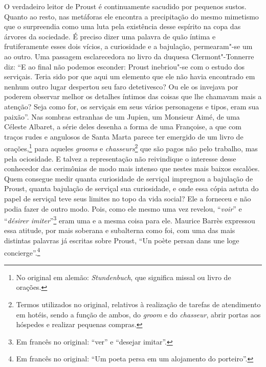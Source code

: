 O verdadeiro leitor de Proust é continuamente sacudido por pequenos
sustos. Quanto ao resto, nas metáforas ele encontra a precipitação do
mesmo mimetismo que o surpreendia como uma luta pela existência desse
espírito na copa das árvores da sociedade. É preciso dizer uma palavra
de quão íntima e frutiferamente esses dois vícios, a curiosidade e a
bajulação, permearam"-se um ao outro. Uma passagem esclarecedora no livro
da duquesa Clermont"-Tonnerre diz: ``E ao final não podemos esconder:
Proust inebriou"-se com o estudo dos serviçais. Teria sido por que aqui um
elemento que ele não havia encontrado em nenhum outro lugar despertou
seu faro detetivesco? Ou ele os invejava por poderem observar melhor os
detalhes íntimos das coisas que lhe chamavam mais a atenção? Seja como
for, os serviçais em seus vários personagens e tipos, eram sua paixão''.
Nas sombras estranhas de um Jupien, um Monsieur Aimé, de uma Céleste
Albaret, a série deles desenha a forma de uma Françoise, a que com
traços rudes e angulosos de Santa Marta parece ter emergido de um livro
de orações,\footnote{No original em alemão: \emph{Stundenbuch}, que significa
  missal ou livro de orações. \versal{[N.~T.]}} para aqueles \emph{grooms} e
\emph{chasseurs}\footnote{Termos utilizados no original, relativos
  à realização de tarefas de atendimento em hotéis, sendo a função de
  ambos, do \emph{groom} e do \emph{chasseur}, abrir portas aos hóspedes
  e realizar pequenas compras. \versal{[N.~T.]}} que são pagos não pelo trabalho, mas
pela ociosidade. E talvez a representação não reivindique o interesse
desse conhecedor das cerimônias de modo mais intenso que nestes mais
baixos escalões. Quem consegue medir quanta curiosidade de serviçal
impregnou a bajulação de Proust, quanta bajulação de serviçal sua
curiosidade, e onde essa cópia astuta do papel de serviçal teve seus
limites no topo da vida social? Ele a forneceu e não podia fazer de
outro modo. Pois, como ele mesmo uma vez revelou, ``\emph{voir}'' e
``\emph{désirer imiter}''\footnote{Em francês no original: ``ver'' e ``desejar imitar''. \versal{[N.~T.]}}
eram uma e a mesma coisa para ele. Maurice Barrès expressou essa
atitude, por mais soberana e subalterna como foi, com uma das mais
distintas palavras já escritas sobre Proust, ``Un poète persan dans une
loge concierge''.\footnote{Em francês no original: ``Um poeta persa em um alojamento do
  porteiro''. \versal{[N.~T.]}}

